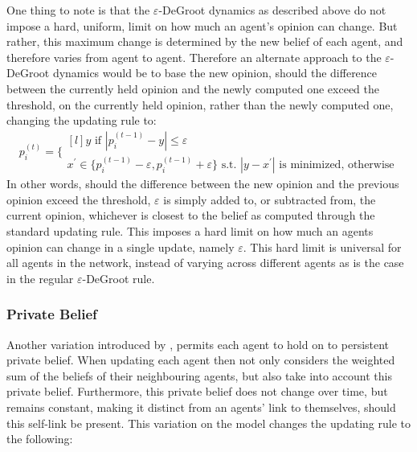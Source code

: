 \documentclass{article}
\newcommand{\beli}[3][2]{p_{#2}^{(#3)}}
\begin{document}
One thing to note is that the $\varepsilon$-DeGroot dynamics as described above do not impose a hard, uniform, limit on how much an agent's opinion can change. But rather, this maximum change is determined by the new belief of each agent, and therefore varies from agent to agent. Therefore an alternate approach to the $\varepsilon$-DeGroot dynamics would be to base the new opinion, should the difference between the currently held opinion and the newly computed one exceed the threshold, on the currently held opinion, rather than the newly computed one, changing the updating rule to:
\begin{equation*}
    \label{edegroot:alt}
    \beli{i}{t} =\Bigg\{
    \begin{matrix*}[l]
        y \text{ if } |\beli{i}{t-1} - y| \leq \varepsilon\\
        x^{\prime}\in\{\beli{i}{t-1}-\varepsilon, \beli{i}{t-1}+\varepsilon\}\text{ s.t. }|y - x^{\prime}|\text{ is minimized, otherwise}
    \end{matrix*}
\end{equation*}
In other words, should the difference between the new opinion and the previous opinion exceed the threshold, $\varepsilon$ is simply added to, or subtracted from, the current opinion, whichever is closest to the belief as computed through the standard updating rule. This imposes a hard limit on how much an agents opinion can change in a single update, namely $\varepsilon$. This hard limit is universal for all agents in the network, instead of varying across different agents as is the case in the regular $\varepsilon$-DeGroot rule.

\subsubsection{Private Belief}

Another variation introduced by \cite{friedkin1990private}, permits each agent to hold on to persistent private belief. When updating each agent then not only considers the weighted sum of the beliefs of their neighbouring agents, but also take into account this private belief. Furthermore, this private belief does not change over time, but remains constant, making it distinct from an agents' link to themselves, should this self-link be present. This variation on the model changes the updating rule to the following:
\end{document}
